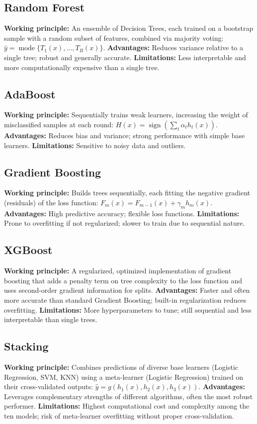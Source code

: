 \documentclass[12pt,a4paper]{article}
\begin{document}
\subsection*{Random Forest}
\textbf{Working principle:} An ensemble of Decision Trees, each trained on a bootstrap sample with a random subset of features, combined via majority voting: $\hat{y}=\operatorname{mode}\{T_1(x),\dots,T_B(x)\}$.
\textbf{Advantages:} Reduces variance relative to a single tree; robust and generally accurate.
\textbf{Limitations:} Less interpretable and more computationally expensive than a single tree.

\subsection*{AdaBoost}
\textbf{Working principle:} Sequentially trains weak learners, increasing the weight of misclassified samples at each round: $H(x)=\operatorname{sign}\left(\sum_t \alpha_t h_t(x)\right)$.
\textbf{Advantages:} Reduces bias and variance; strong performance with simple base learners.
\textbf{Limitations:} Sensitive to noisy data and outliers.

\subsection*{Gradient Boosting}
\textbf{Working principle:} Builds trees sequentially, each fitting the negative gradient (residuals) of the loss function: $F_m(x)=F_{m-1}(x)+\gamma_m h_m(x)$.
\textbf{Advantages:} High predictive accuracy; flexible loss functions.
\textbf{Limitations:} Prone to overfitting if not regularized; slower to train due to sequential nature.

\subsection*{XGBoost}
\textbf{Working principle:} A regularized, optimized implementation of gradient boosting that adds a penalty term on tree complexity to the loss function and uses second-order gradient information for splits.
\textbf{Advantages:} Faster and often more accurate than standard Gradient Boosting; built-in regularization reduces overfitting.
\textbf{Limitations:} More hyperparameters to tune; still sequential and less interpretable than single trees.

\subsection*{Stacking}
\textbf{Working principle:} Combines predictions of diverse base learners (Logistic Regression, SVM, KNN) using a meta-learner (Logistic Regression) trained on their cross-validated outputs: $\hat{y}=g(h_1(x),h_2(x),h_3(x))$.
\textbf{Advantages:} Leverages complementary strengths of different algorithms, often the most robust performer.
\textbf{Limitations:} Highest computational cost and complexity among the ten models; risk of meta-learner overfitting without proper cross-validation.
\end{document}
